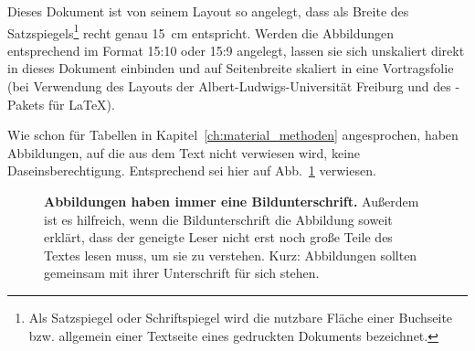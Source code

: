 Dieses Dokument ist von seinem Layout so angelegt, dass als Breite des Satzspiegels\footnote{Als Satzspiegel oder Schriftspiegel wird die nutzbare Fläche einer Buchseite bzw. allgemein einer Textseite eines gedruckten Dokuments bezeichnet.} recht genau 15~cm entspricht. Werden die Abbildungen entsprechend im Format 15:10 oder 15:9 angelegt, lassen sie sich unskaliert direkt in dieses Dokument einbinden und auf Seitenbreite skaliert in eine Vortragsfolie (bei Verwendung des Layouts der Albert-Ludwigs-Universität Freiburg und des -Pakets für \LaTeX{}).

Wie schon für Tabellen in Kapitel~\ref{ch:material_methoden} angesprochen, haben Abbildungen, auf die aus dem Text nicht verwiesen wird, keine Daseinsberechtigung. Entsprechend sei hier auf Abb.~\ref{fig:beispiel} verwiesen.

\begin{figure}[t]

\caption[Abbildungen haben immer eine Bildunterschrift.]{\textbf{Abbildungen haben immer eine Bildunterschrift.} Außerdem ist es hilfreich, wenn die Bildunterschrift die Abbildung soweit erklärt, dass der geneigte Leser nicht erst noch große Teile des Textes lesen muss, um sie zu verstehen. Kurz: Abbildungen sollten gemeinsam mit ihrer Unterschrift für sich stehen.}
\label{fig:beispiel}
\end{figure}
